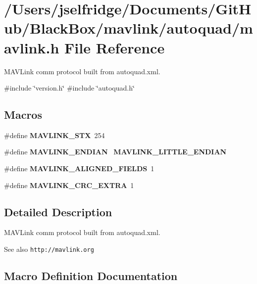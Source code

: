 \section{/\+Users/jselfridge/\+Documents/\+Git\+Hub/\+Black\+Box/mavlink/autoquad/mavlink.h File Reference}
\label{autoquad_2mavlink_8h}


M\+A\+V\+Link comm protocol built from autoquad.\+xml.  


{\ttfamily \#include \char`\"{}version.\+h\char`\"{}}\newline
{\ttfamily \#include \char`\"{}autoquad.\+h\char`\"{}}\newline
\subsection*{Macros}
\begin{DoxyCompactItemize}
\item 
\#define \textbf{ M\+A\+V\+L\+I\+N\+K\+\_\+\+S\+TX}~254
\item 
\#define \textbf{ M\+A\+V\+L\+I\+N\+K\+\_\+\+E\+N\+D\+I\+AN}~\textbf{ M\+A\+V\+L\+I\+N\+K\+\_\+\+L\+I\+T\+T\+L\+E\+\_\+\+E\+N\+D\+I\+AN}
\item 
\#define \textbf{ M\+A\+V\+L\+I\+N\+K\+\_\+\+A\+L\+I\+G\+N\+E\+D\+\_\+\+F\+I\+E\+L\+DS}~1
\item 
\#define \textbf{ M\+A\+V\+L\+I\+N\+K\+\_\+\+C\+R\+C\+\_\+\+E\+X\+T\+RA}~1
\end{DoxyCompactItemize}


\subsection{Detailed Description}
M\+A\+V\+Link comm protocol built from autoquad.\+xml. 

\begin{DoxySeeAlso}{See also}
{\tt http\+://mavlink.\+org} 
\end{DoxySeeAlso}


\subsection{Macro Definition Documentation}
\mbox{\label{autoquad_2mavlink_8h_a66ac6e7995651b5a5cb317194c1f46e0}} 
